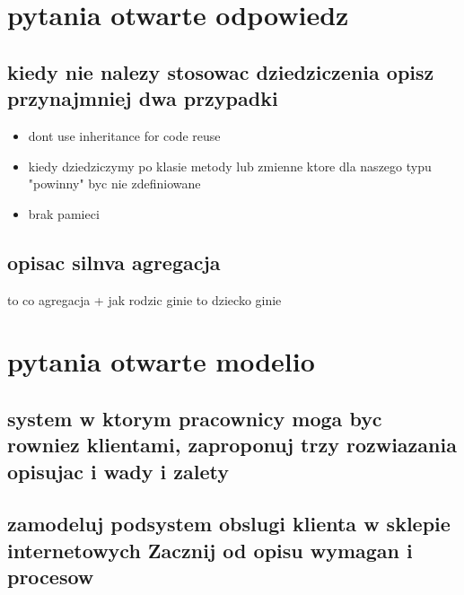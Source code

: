 \documentclass[11pt]{article}
\begin{document}
\section{pytania otwarte odpowiedz}
\label{sec:org5225fcc}
\subsection{kiedy nie nalezy stosowac dziedziczenia opisz przynajmniej dwa przypadki}
\label{sec:org179fd73}
\begin{itemize}
\item dont use inheritance for code reuse
\item kiedy dziedziczymy po klasie metody lub zmienne ktore dla naszego typu "powinny" byc nie zdefiniowane
\item brak pamieci
\end{itemize}
\subsection{opisac silnva agregacja}
\label{sec:orgcb737b1}
to co agregacja + jak rodzic ginie to dziecko ginie
\section{pytania otwarte modelio}
\label{sec:org2819f83}
\subsection{system w ktorym pracownicy moga byc rowniez klientami, zaproponuj trzy rozwiazania opisujac i wady i zalety}
\label{sec:org9e318b0}
\subsection{zamodeluj podsystem obslugi klienta w sklepie internetowych Zacznij od opisu wymagan i procesow}
\label{sec:org1b8fe66}
\end{document}
